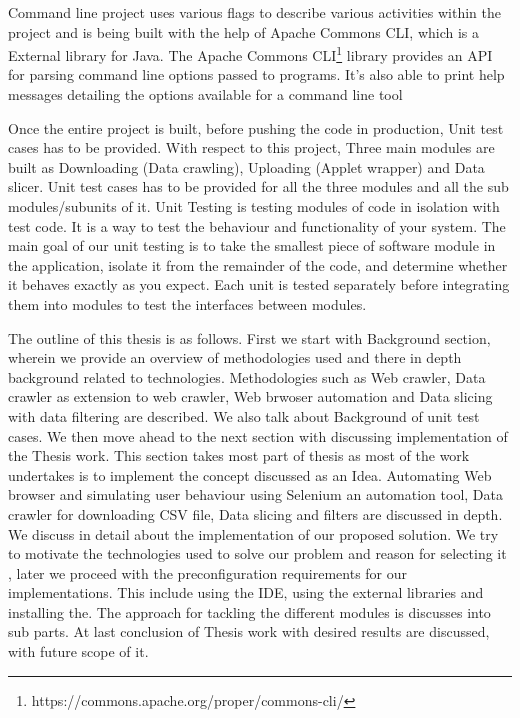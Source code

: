 \documentclass[article,type=msc,colorback,accentcolor=tud9c,twoside,11pt]{tudthesis}
\begin{document}
	Command line project uses various flags to describe various activities within the project and is being built with the help of Apache Commons CLI, which is a External library for Java. The Apache Commons CLI\footnote{https://commons.apache.org/proper/commons-cli/} library provides an API for parsing command line options passed to programs. It's also able to print help messages detailing the options available for a command line tool
	
	
	Once the entire project is built, before pushing the code in production, Unit test cases has to be provided. With respect to this project, Three main modules are built as Downloading (Data crawling), Uploading (Applet wrapper) and Data slicer. Unit test cases has to be provided for all the three modules and all the sub modules/subunits of it. Unit Testing\cite{EffectivnessofUnitTest} is testing modules of code in isolation with test code. It is a way to test the behaviour and functionality of your system. The main goal of our unit testing is to take the smallest piece of software module in the application, isolate it from the remainder of the code, and determine whether it behaves exactly as you expect. Each unit is tested separately before integrating them into modules to test the interfaces between modules.
	
	
	The outline of this thesis is as follows. First we start with Background section, wherein we provide an overview of methodologies used and there in depth background related to technologies. Methodologies such as Web crawler, Data crawler as extension to web crawler, Web brwoser automation and Data slicing with data filtering are described. We also talk about Background of unit test cases. We then move ahead to the next section with discussing implementation of the Thesis work. This section takes most part of thesis as most of the work undertakes is to implement the concept discussed as an Idea. Automating Web browser and simulating user behaviour using Selenium an automation tool, Data crawler for downloading CSV file, Data slicing and filters are discussed in depth. We discuss in detail about the implementation of our proposed solution. We try to motivate the technologies used to solve our problem and reason for selecting it , later we proceed with the preconfiguration requirements for our implementations. This include using the IDE, using the external libraries and installing the. The approach for tackling the different modules is discusses into sub parts. At last conclusion of Thesis work with desired results are discussed, with future scope of it.
	
\end{document}
